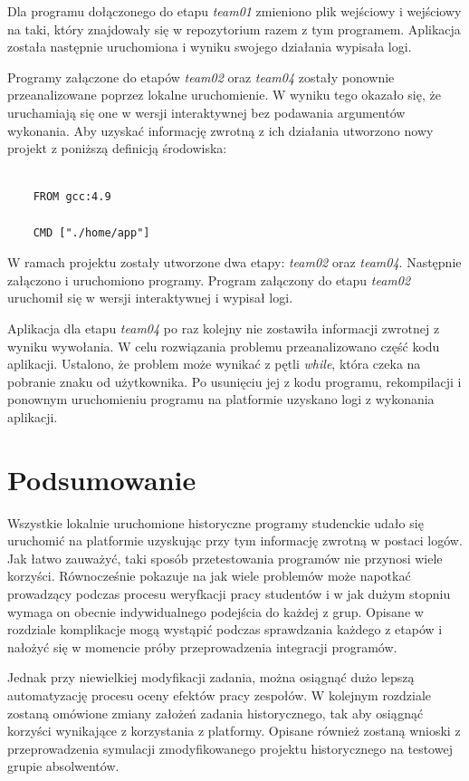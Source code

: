 Dla programu dołączonego do etapu \textit{team01} zmieniono plik wejściowy i wejściowy na taki, który znajdowały się w repozytorium razem z tym programem.
Aplikacja została następnie uruchomiona i wyniku swojego działania wypisała logi.

Programy załączone do etapów \textit{team02} oraz \textit{team04} zostały ponownie przeanalizowane poprzez lokalne uruchomienie.
W wyniku tego okazało się, że uruchamiają się one w wersji interaktywnej bez podawania argumentów wykonania.
Aby uzyskać informację zwrotną z ich działania utworzono nowy projekt z poniższą definicją środowiska:

{\selectfont
\tiny
\begin{lstlisting}

    FROM gcc:4.9

    CMD ["./home/app"]

\end{lstlisting}
}

W ramach projektu zostały utworzone dwa etapy:  \textit{team02} oraz \textit{team04}.
Następnie załączono i uruchomiono programy.
Program załączony do etapu \textit{team02} uruchomił się w wersji interaktywnej i wypisał logi.

Aplikacja dla etapu \textit{team04} po raz kolejny nie zostawiła informacji zwrotnej z wyniku wywołania.
W celu rozwiązania problemu przeanalizowano część kodu aplikacji.
Ustalono, że problem może wynikać z pętli \textit{while}, która czeka na pobranie znaku od użytkownika.
Po usunięciu jej z kodu programu, rekompilacji i ponownym uruchomieniu programu na platformie uzyskano logi z wykonania aplikacji.


\section{Podsumowanie}
\label{verification_summary}

Wszystkie lokalnie uruchomione  historyczne programy  studenckie udało się uruchomić na platformie uzyskując przy tym informację zwrotną w postaci logów.
Jak łatwo zauważyć, taki sposób przetestowania programów nie przynosi wiele korzyści.
Równocześnie pokazuje na jak wiele problemów może napotkać prowadzący podczas procesu weryfkacji pracy studentów i w jak dużym stopniu wymaga on obecnie indywidualnego podejścia do każdej z grup.
Opisane w rozdziale komplikacje mogą wystąpić podczas sprawdzania każdego z etapów i nałożyć się w momencie próby przeprowadzenia integracji programów.

Jednak przy niewielkiej modyfikacji zadania, można osiągnąć dużo lepszą automatyzację procesu oceny efektów pracy zespołów.
W kolejnym rozdziale zostaną omówione zmiany założeń zadania historycznego, tak aby osiągnąć korzyści wynikające z korzystania z platformy.
Opisane również zostaną wnioski z przeprowadzenia symulacji zmodyfikowanego projektu historycznego na testowej grupie absolwentów.
